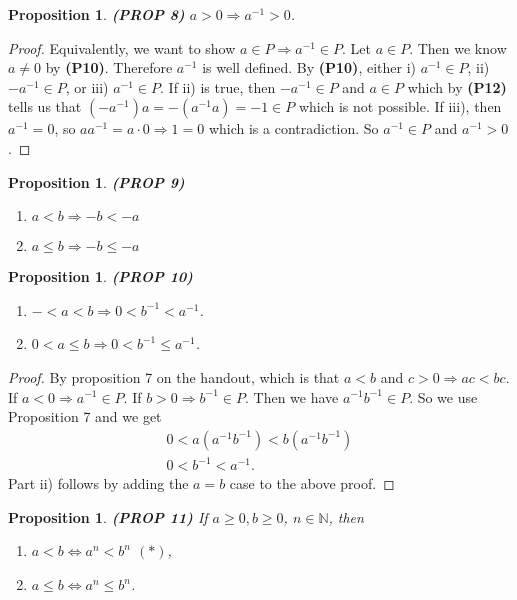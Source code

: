 \documentclass[12pt]{amsbook}
\theoremstyle{plain}
\numberwithin{section}{chapter}
\numberwithin{equation}{chapter}
\newtheorem{Prop}[theorem]{Proposition}
\theoremstyle{definition}
\theoremstyle{remark}
\theoremstyle{plain}
\newcommand{\n}{\mathbb{N}}
\newcommand{\bee}{\begin{equation}\begin{aligned}}
\newcommand{\eee}{\end{aligned}\end{equation}}
\renewcommand{\leq}{\leqslant}
\renewcommand{\geq}{\geqslant}
\begin{document}
\begin{Prop}
\textbf{(PROP 8)} $a > 0 \Rightarrow a^{-1} > 0$. 
\end{Prop}

\begin{proof}
Equivalently, we want to show $a \in P \Rightarrow a^{-1} \in P$. Let $a \in P$. Then we know $a \neq 0$ by \textbf{(P10)}. Therefore $a^{-1}$ is well defined. By \textbf{(P10)}, either i) $a^{-1} \in P$, ii) $-a^{-1} \in P$, or iii) $a^{-1} \in P$. If ii) is true, then $-a^{-1} \in P$ and $a \in P$ which by \textbf{(P12)} tells us that $(-a^{-1})a = - (a^{-1}a) = -1 \in P$ which is not possible. If iii), then $a^{-1} = 0$, so $aa^{-1} = a \cdot 0 \Rightarrow 1 = 0$ which is a contradiction. So $a^{-1} \in P$ and $a^{-1} > 0$. 
\end{proof}

\begin{Prop}
\textbf{(PROP 9)}
\begin{enumerate}[label=\roman*)]
\item $a < b \Rightarrow -b < -a$
\item $a \leq b \Rightarrow -b \leq -a$
\end{enumerate}
\end{Prop}

\begin{Prop}
\textbf{(PROP 10)}
\begin{enumerate}[label=\roman*)]
\item $- < a < b \Rightarrow 0 < b^{-1} < a^{-1}$. 
\item $0 < a \leq b \Rightarrow 0 < b^{-1} \leq a^{-1}$. 
\end{enumerate}
\end{Prop}

\begin{proof}
By proposition 7 on the handout, which is that $a < b$ and $c > 0 \Rightarrow ac < bc$. If $a < 0 \Rightarrow a^{-1} \in P$. If $b > 0 \Rightarrow b^{-1} \in P$. Then we have $a^{-1}b^{-1} \in P$. So we use Proposition 7 and we get
\bee
0 < a(a^{-1}b^{-1}) < b(a^{-1}b^{-1})\\
0 < b^{-1} < a^{-1}.
\eee
Part ii) follows by adding the $a = b$ case to the above proof. 
\end{proof}

\begin{Prop}
\textbf{(PROP 11)} If $a \geq 0, b \geq 0$, $n \in \n$, then
\begin{enumerate}[label=\roman*)]
\item $ a < b \Leftrightarrow a^n < b^n$ $(*)$,
\item $a \leq b \Leftrightarrow a^n \leq b^n$.
\end{enumerate}
\end{Prop}
\end{document}
